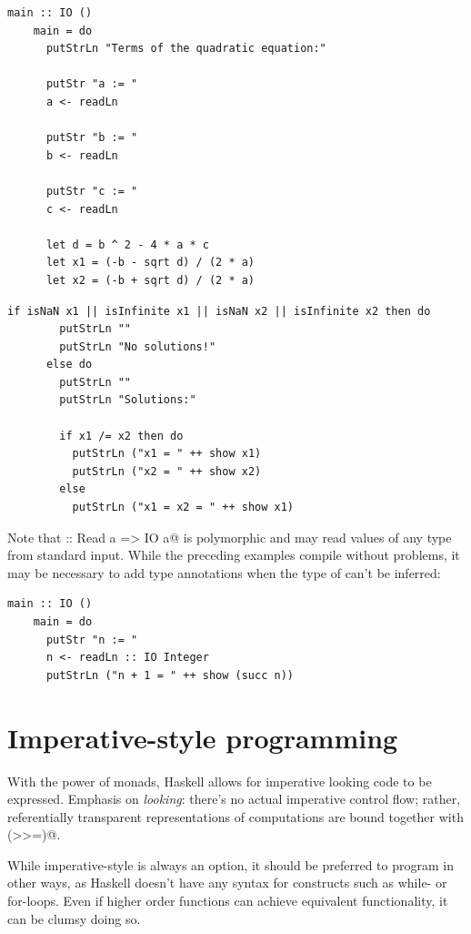 \documentclass[UdineBachThesis,american,11pt]{PhdThesis}
\begin{document}
  \begin{lstlisting}[gobble=4,basicstyle=\ttfamily\small]
    main :: IO ()
    main = do
      putStrLn "Terms of the quadratic equation:"

      putStr "a := "
      a <- readLn

      putStr "b := "
      b <- readLn

      putStr "c := "
      c <- readLn

      let d = b ^ 2 - 4 * a * c
      let x1 = (-b - sqrt d) / (2 * a)
      let x2 = (-b + sqrt d) / (2 * a)
  \end{lstlisting}

  \pagebreak

  \begin{lstlisting}[gobble=4,basicstyle=\ttfamily\small]
      if isNaN x1 || isInfinite x1 || isNaN x2 || isInfinite x2 then do
        putStrLn ""
        putStrLn "No solutions!"
      else do
        putStrLn ""
        putStrLn "Solutions:"

        if x1 /= x2 then do
          putStrLn ("x1 = " ++ show x1)
          putStrLn ("x2 = " ++ show x2)
        else
          putStrLn ("x1 = x2 = " ++ show x1)
  \end{lstlisting}

  Note that \lstinline@readLn :: Read a => IO a@ is polymorphic and may read
  values of any type from standard input. While the preceding examples compile
  without problems, it may be necessary to add type annotations when the type of
  \lstinline@readLn@ can't be inferred:

  \begin{lstlisting}[gobble=4,basicstyle=\ttfamily\small]
    main :: IO ()
    main = do
      putStr "n := "
      n <- readLn :: IO Integer
      putStrLn ("n + 1 = " ++ show (succ n))
  \end{lstlisting}

  \section{Imperative-style programming}

  With the power of monads, Haskell allows for imperative looking code to be
  expressed. Emphasis on \emph{looking}: there's no actual imperative control
  flow; rather, referentially transparent representations of computations are
  bound together with \lstinline@(>>=)@.

  While imperative-style is always an option, it should be preferred to program
  in other ways, as Haskell doesn't have any syntax for constructs such as
  while- or for-loops. Even if higher order functions can achieve equivalent
  functionality, it can be clumsy doing so.
\end{document}
